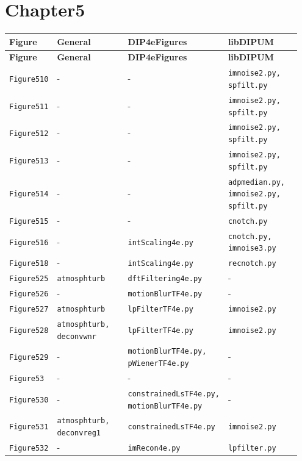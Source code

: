 \documentclass[10pt]{article}
\begin{document}
\section*{Chapter5}
\setlength{\tabcolsep}{4pt}
\begin{longtable}{p{0.11\linewidth} p{0.28\linewidth} p{0.28\linewidth} p{0.28\linewidth}}
\toprule
\textbf{Figure} & \textbf{General} & \textbf{DIP4eFigures} & \textbf{libDIPUM} \\
\midrule
\endfirsthead
\toprule
\textbf{Figure} & \textbf{General} & \textbf{DIP4eFigures} & \textbf{libDIPUM} \\
\midrule
\endhead
\bottomrule
\endfoot
\texttt{Figure510} & - & - & \texttt{imnoise2.py, spfilt.py} \\
\texttt{Figure511} & - & - & \texttt{imnoise2.py, spfilt.py} \\
\texttt{Figure512} & - & - & \texttt{imnoise2.py, spfilt.py} \\
\texttt{Figure513} & - & - & \texttt{imnoise2.py, spfilt.py} \\
\texttt{Figure514} & - & - & \texttt{adpmedian.py, imnoise2.py, spfilt.py} \\
\texttt{Figure515} & - & - & \texttt{cnotch.py} \\
\texttt{Figure516} & - & \texttt{intScaling4e.py} & \texttt{cnotch.py, imnoise3.py} \\
\texttt{Figure518} & - & \texttt{intScaling4e.py} & \texttt{recnotch.py} \\
\texttt{Figure525} & \texttt{atmosphturb} & \texttt{dftFiltering4e.py} & - \\
\texttt{Figure526} & - & \texttt{motionBlurTF4e.py} & - \\
\texttt{Figure527} & \texttt{atmosphturb} & \texttt{lpFilterTF4e.py} & \texttt{imnoise2.py} \\
\texttt{Figure528} & \texttt{atmosphturb, deconvwnr} & \texttt{lpFilterTF4e.py} & \texttt{imnoise2.py} \\
\texttt{Figure529} & - & \texttt{motionBlurTF4e.py, pWienerTF4e.py} & - \\
\texttt{Figure53} & - & - & - \\
\texttt{Figure530} & - & \texttt{constrainedLsTF4e.py, motionBlurTF4e.py} & - \\
\texttt{Figure531} & \texttt{atmosphturb, deconvreg1} & \texttt{constrainedLsTF4e.py} & \texttt{imnoise2.py} \\
\texttt{Figure532} & - & \texttt{imRecon4e.py} & \texttt{lpfilter.py} \\

\end{longtable}
\end{document}
